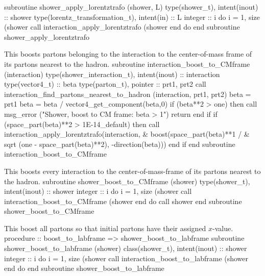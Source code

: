 \nwendcode{} %
\nwenddocs{}\nwdocspar
\nwenddocs{}\plusendmoddef
  subroutine shower_apply_lorentztrafo (shower, L)
    type(shower_t), intent(inout) :: shower
    type(lorentz_transformation_t), intent(in) :: L
    integer :: i
    do i = 1, size (shower%
       call interaction_apply_lorentztrafo (shower%
    end do
  end subroutine shower_apply_lorentztrafo

\eatline
\nwendcode{}This boosts partons belonging to the interaction to the
center-of-mass frame of its partons nearest to the hadron.
\nwenddocs{}\plusendmoddef
  subroutine interaction_boost_to_CMframe (interaction)
    type(shower_interaction_t), intent(inout) :: interaction
    type(vector4_t) :: beta
    type(parton_t), pointer :: prt1, prt2
    call interaction_find_partons_nearest_to_hadron (interaction, prt1, prt2)
    beta = prt1%
    beta = beta / vector4_get_component(beta,0)
    if (beta**2 > one) then
       call msg_error ("Shower, boost to CM frame: beta > 1")
       return
    end if
    if (space_part(beta)**2 > 1E-14_default) then
       call interaction_apply_lorentztrafo(interaction, &
            boost(space_part(beta)**1 / &
              sqrt (one - space_part(beta)**2), -direction(beta)))
    end if
  end subroutine interaction_boost_to_CMframe

\eatline
\nwendcode{}This boosts every interaction to the center-of-mass-frame of its
partons nearest to the hadron.
\nwenddocs{}\plusendmoddef
  subroutine shower_boost_to_CMframe (shower)
    type(shower_t), intent(inout) :: shower
    integer :: i
    do i = 1, size (shower%
       call interaction_boost_to_CMframe (shower%
    end do
    call shower%
  end subroutine shower_boost_to_CMframe

\eatline
\nwendcode{}This boost all partons so that initial partons have their assigned
$x$-value.
\nwenddocs{}\plusendmoddef
  procedure :: boost_to_labframe => shower_boost_to_labframe
\nwendcode{}\plusendmoddef
  subroutine shower_boost_to_labframe (shower)
    class(shower_t), intent(inout) :: shower
    integer :: i
    do i = 1, size (shower%
       call interaction_boost_to_labframe (shower%
    end do
  end subroutine shower_boost_to_labframe


